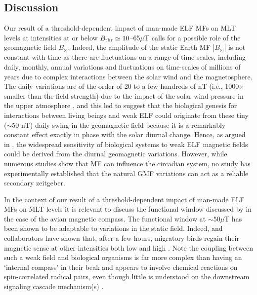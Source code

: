 \documentclass[letter,twoside]{article}
\begin{document}
\subsection*{Discussion}
 \label{section:discussion}
 


Our result of a threshold-dependent impact of man-made ELF MFs on MLT levels at intensities at or below $B_{\rm thr}\simeq10$--65$\mu$T  calls for a possible  role of the geomagnetic field $B_{\odot}$.  Indeed, the amplitude of the static Earth MF $|B_{\odot}|$ is not constant with time as there are fluctuations on a range of time-scales, including daily, monthly, annual variations and fluctuations on time-scales of millions of years \citep[see e.g.][]{CourtillotV_1988} due to complex interactions between the solar wind and the magnetosphere.  The daily variations are of the order of 20 to a few hundreds of  nT (i.e., 1000$\times$ smaller than the field strength)
 due to the impact of the solar wind pressure in the upper atmosphere \citep[e.g.][]{Hitchman1998},   
and this led \citet{Liboff2013}  to suggest that the
biological genesis for interactions between living beings and weak ELF could originate from these tiny ($\sim$50 nT) daily swing in the geomagnetic field    because it is a remarkably constant effect exactly in phase with the solar diurnal change.  Hence, as argued in  \citet{Liboff2013},  the widespread sensitivity of biological systems to weak ELF magnetic fields could be  derived from the diurnal geomagnetic variations.
However, while numerous studies show that MF
can influence the circadian system, no study has experimentally established that the natural GMF variations can act as a reliable secondary zeitgeber.
 
In the context of our result of a threshold-dependent impact of man-made ELF MFs on MLT levels 
 it is relevant to  discuss the functional window discussed  by \citet{Wiltschko2014} 
in the case of the   avian magnetic compass. The functional window  at $\sim50\mu$T has been shown to be adaptable to variations in the static field.
Indeed, \citet{Wiltschko2014} and collaborators have shown that, after a few hours, migratory birds regain their magnetic sense at other intensities both low \citep[e.g.][as low as 4$\mu$T]{Winklhofer2013} and high \citep[][up to 92$\mu$T]{Wiltschko2006}. Note the coupling between such a weak field and biological organisms \citep[e.g.][]{ Kattnig2017,Hore2016,Ritz2000,Vanderstraeten2010,Vanderstraeten2018} is far more complex than having  an `internal compass' in their beak and appears to involve chemical reactions on spin-correlated radical pairs, even though  little is understood on the downstream signaling cascade mechanism(s)  \citep[as reviewed in][]{Nordmann2017}.
 
\end{document}
